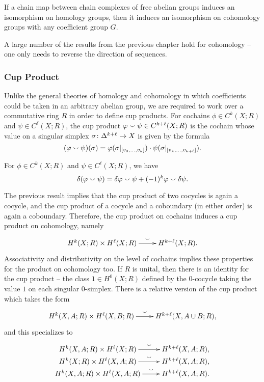 \begin{corollary}
  If a chain map between chain complexes of free abelian groups induces an isomorphism on homology groups, then it induces an isomorphism on cohomology groups with any coefficient group $G$.
\end{corollary}

A large number of the results from the previous chapter hold for cohomology -- one only needs to reverse the direction of sequences.

\subsubsection{Cup Product}

Unlike the general theories of homology and cohomology in which coefficients could be taken in an arbitrary abelian group, we are required to work over a commutative ring $R$ in order to define cup products. For cochains $\phi \in C^k(X; R)$ and $\psi \in C^\ell(X; R)$, the cup product $\varphi \smallsmile \psi \in C^{k+\ell}(X;R)$ is the cochain whose value on a singular simplex $\sigma \colon \Delta^{k+\ell} \rightarrow X$ is given by the formula
\[
(\varphi \smallsmile \psi)(\sigma) = \varphi(\sigma|_{[v_0, \dots, v_k]}) \cdot \psi(\sigma|_{[v_k, \dots, v_{k+\ell}]}).
\]

\begin{proposition}
  For $\phi \in C^k(X;R)$ and $\psi \in C^\ell(X; R)$, we have
  \[
  \delta(\varphi \smallsmile \psi) = \delta\varphi \smallsmile \psi + (-1)^k \varphi \smallsmile \delta\psi.
  \]
\end{proposition}

The previous result implies that the cup product of two cocycles is again a cocycle, and the cup product of a cocycle and a coboundary (in either order) is again a coboundary. Therefore, the cup product on cochains induces a cup product on cohomology, namely
\[\xymatrix{
H^k(X;R) \x H^\ell(X;R) \ar[r]^-\wcup & H^{k+\ell}(X;R).
}\]
Associativity and distributivity on the level of cochains implies these properties for the product on cohomology too. If $R$ is unital, then there is an identity for the cup product -- the class $1 \in H^0(X;R)$ defined by the $0$-cocycle taking the value $1$ on each singular $0$-simplex. There is a relative version of the cup product which takes the form
\[\xymatrix{
  H^k(X,A;R) \x H^\ell(X,B;R) \ar[r]^-\wcup & H^{k+\ell}(X, A \cup B; R),
}\]
and this specializes to
\[\xymatrix@R=0in{
  H^k(X,A;R) \x H^\ell(X;  R) \ar[r]^-\wcup & H^{k+\ell}(X, A; R), \\
  H^k(X;  R) \x H^\ell(X,A;R) \ar[r]^-\wcup & H^{k+\ell}(X, A; R), \\
  H^k(X,A;R) \x H^\ell(X,A;R) \ar[r]^-\wcup & H^{k+\ell}(X, A; R).
}\]

